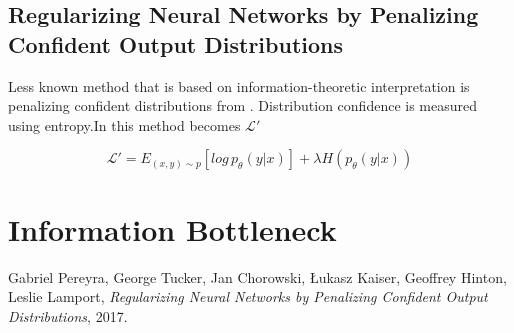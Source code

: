 \documentclass{article}
\newcommand{\loss}{\mathcal{L}}
\begin{document}
\subsection{Regularizing Neural Networks by Penalizing Confident Output Distributions}

Less known method that is based on information-theoretic interpretation is penalizing confident distributions from \cite{penalizing}. Distribution confidence is measured using entropy.In this method becomes $\loss'$

$$\loss' = E_{(x,y) \sim p}[log\, p_\theta(y|x)] + \lambda H(p_\theta(y|x))$$

\section{Information Bottleneck}


\begin{thebibliography}{9}
  Gabriel Pereyra, George Tucker, Jan Chorowski, Łukasz Kaiser, Geoffrey Hinton,
  Leslie Lamport,
  \textit{Regularizing Neural Networks by Penalizing Confident Output Distributions},
  2017.

\end{thebibliography}
\end{document}
